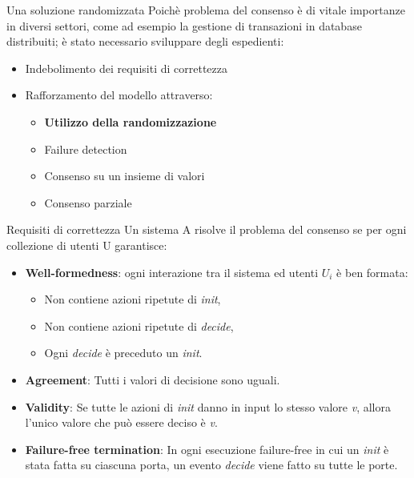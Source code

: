 \documentclass{beamer}
\begin{document}
\begin{frame}{Una soluzione randomizzata}
    Poichè problema del consenso è di vitale importanze in diversi settori, come ad esempio la gestione di transazioni in database distribuiti; è stato necessario sviluppare degli espedienti:
    \vspace{0.2cm}
    \begin{itemize}
        \item Indebolimento dei requisiti di correttezza
        \item Rafforzamento del modello attraverso:
        \vspace{0.2cm}
        
        \begin{itemize}
            \item \textbf{Utilizzo della randomizzazione}
            \item Failure detection
            \item Consenso su un insieme di valori
            \item Consenso parziale
        \end{itemize}
    \end{itemize}
\end{frame}

\begin{frame}{Requisiti di correttezza}
    Un sistema A risolve il problema del consenso se per ogni collezione di utenti U garantisce:
    \begin{itemize}
        \item \textbf{Well-formedness}: ogni interazione tra il sistema ed utenti $U_{i}$ è ben formata:
        \begin{itemize}
            \item Non contiene azioni ripetute di \textit{init},
            \item Non contiene azioni ripetute di \textit{decide},
            \item Ogni \textit{decide} è preceduto un \textit{init}.
        \end{itemize}
        \item \textbf{Agreement}: Tutti i valori di decisione sono uguali.
        \item \textbf{Validity}: Se tutte le azioni di \textit{init} danno in input lo stesso valore \textit{v}, allora l'unico valore che può essere deciso è \textit{v}.
        \item \textbf{Failure-free termination}: In ogni esecuzione failure-free in cui un \textit{init} è stata fatta su ciascuna porta, un evento \textit{decide} viene fatto su tutte le porte.
    \end{itemize}
\end{frame}
\end{document}
